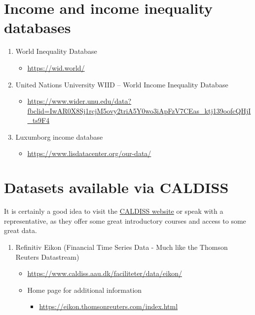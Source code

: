 \documentclass[
]{book}
\providecommand{\tightlist}{%
  \setlength{\itemsep}{0pt}\setlength{\parskip}{0pt}}
\begin{document}
\hypertarget{income-and-income-inequality-databases}{%
\section{Income and income inequality databases}\label{income-and-income-inequality-databases}}

\begin{enumerate}
\def\labelenumi{\arabic{enumi}.}
\tightlist
\item
  World Inequality Database

  \begin{itemize}
  \tightlist
  \item
    \url{https://wid.world/}
  \end{itemize}
\item
  United Nations University WIID -- World Income Inequality Database

  \begin{itemize}
  \tightlist
  \item
    \url{https://www.wider.unu.edu/data?fbclid=IwAR0X8Sj1rcjM5ovy2triA5Y0wo3iApFzV7CEas_ktj139oofcQHjI_ts9F4}
  \end{itemize}
\item
  Luxumborg income database

  \begin{itemize}
  \tightlist
  \item
    \url{https://www.lisdatacenter.org/our-data/}
  \end{itemize}
\end{enumerate}

\hypertarget{datasets-available-via-caldiss}{%
\section{Datasets available via CALDISS}\label{datasets-available-via-caldiss}}

It is certainly a good idea to visit the \href{https://www.caldiss.aau.dk}{CALDISS website} or speak with a representative, as they offer some great introductory courses and access to some great data.

\begin{enumerate}
\def\labelenumi{\arabic{enumi}.}
\tightlist
\item
  Refinitiv Eikon (Financial Time Series Data - Much like the Thomson Reuters Datastream)

  \begin{itemize}
  \tightlist
  \item
    \url{https://www.caldiss.aau.dk/faciliteter/data/eikon/}
  \item
    Home page for additional information

    \begin{itemize}
    \tightlist
    \item
      \url{https://eikon.thomsonreuters.com/index.html}
    \end{itemize}
  \end{itemize}
\end{enumerate}
\end{document}
